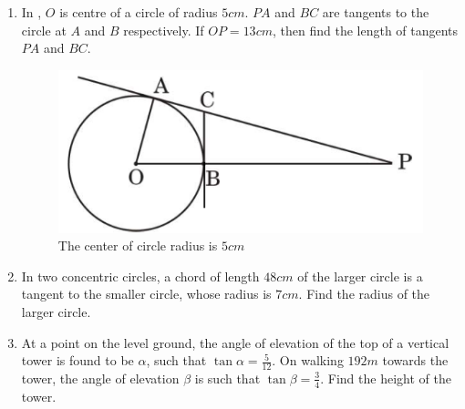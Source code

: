 \begin{enumerate}[label=\arabic*.,ref=\theenumi]
    \item In , $O$ is centre of a circle of radius $5 cm$. $PA$ and $BC$ are tangents to the circle at $A$ and $B$ respectively. If $OP = 13 cm$, then find the length of tangents $PA$ and $BC$.
\begin{figure}[H]                                                                                             \centering                                                                                                \includegraphics[width = \columnwidth]{./figs/circle_radius.png}
\caption{The center of circle radius is $5cm$} 
\label{fig:circle_radius}        
\end{figure}

    \item In two concentric circles, a chord of length $48 cm$ of the larger
circle is a tangent to the smaller circle, whose radius is $7 cm$. Find the radius of the larger circle. 
    \item At a point on the level ground, the angle of elevation of the top
of a vertical tower is found to be $\alpha$, such that $\tan \alpha =\frac{5}{12} $. On walking $192 m$ towards the tower, the angle of elevation $\beta$ is such that $\tan \beta=\frac{3}{4}$. Find the height of the tower. 
    \end{enumerate}

